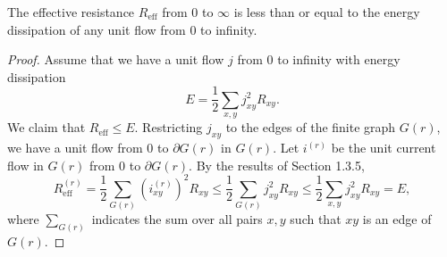 \begin{theorem}[Section 2.4.6]
The effective resistance $R_{\mathrm{eff}}$ from $0$ to $\infty$ is less than or equal to the energy dissipation of any unit flow from $0$ to infinity.
\end{theorem}
\begin{proof}
Assume that we have a unit flow $j$ from $0$ to infinity with energy dissipation
\[
E=\frac12\sum_{x,y}j_{xy}^2R_{xy}.
\]
We claim that $R_{\mathrm{eff}}\le E$. Restricting $j_{xy}$ to the edges of the finite graph $G(r)$, we have a unit flow from $0$ to $\partial G(r)$ in $G(r)$. Let $i^{(r)}$ be the unit current flow in $G(r)$ from $0$ to $\partial G(r)$. By the results of Section 1.3.5,
\[
R_{\mathrm{eff}}^{(r)}=\frac12\sum_{G(r)}(i^{(r)}_{xy})^2R_{xy}
\le\frac12\sum_{G(r)}j_{xy}^2R_{xy}
\le\frac12\sum_{x,y}j_{xy}^2R_{xy}=E,
\]
where $\sum_{G(r)}$ indicates the sum over all pairs $x,y$ such that $xy$ is an edge of $G(r)$.
\end{proof}
